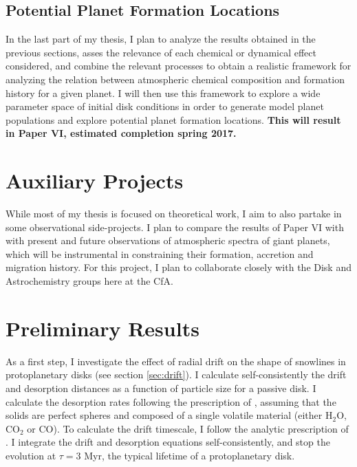 \documentclass[manuscript]{aastex}
\begin{document}
\subsection{Potential Planet Formation Locations} %

In the last part of my thesis, I plan to analyze the results obtained in the previous sections, asses the relevance of each chemical or dynamical effect considered, and combine the relevant processes to obtain a realistic framework for analyzing the relation between atmospheric chemical composition and  formation history for a given planet. I will then use this framework to explore a wide parameter space of initial disk conditions in order to generate model planet populations and explore potential planet formation locations. \textbf{This will result in Paper VI, estimated completion spring 2017.}

\section{Auxiliary Projects}

While most of my thesis is focused on theoretical work, I aim to also partake in some observational side-projects. I plan to compare the results of Paper VI with with present and future observations of atmospheric spectra of giant planets, which will be instrumental in constraining their formation, accretion and migration history. For this project, I plan to collaborate closely with the Disk and Astrochemistry groups here at the CfA. 


\section{Preliminary Results}

As a first step, I investigate the effect of radial drift on the shape of snowlines in protoplanetary disks (see section \ref{sec:drift}). I calculate self-consistently the drift and desorption distances as a function of particle size for a passive disk. I calculate the desorption rates following the prescription of \citet{hollenbach09}, assuming that the solids are perfect spheres and composed of a single volatile material (either H$_2$O, CO$_2$ or CO). To calculate the drift timescale, I follow the analytic prescription of \citet{chiang10}. I integrate the drift and desorption equations self-consistently, and stop the evolution at $\tau=3$ Myr, the typical lifetime of a protoplanetary disk. 
\end{document}

